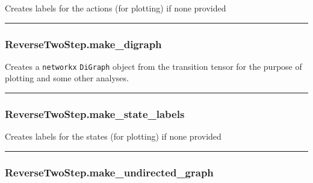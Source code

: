 Creates labels for the actions (for plotting) if none provided

\begin{center}\rule{0.5\linewidth}{\linethickness}\end{center}

\hypertarget{reversetwostep.make_digraph}{%
\subsubsection{ReverseTwoStep.make\_digraph}\label{reversetwostep.make_digraph}}

\begin{Shaded}
\begin{Highlighting}[]
\NormalTok{)}
\end{Highlighting}
\end{Shaded}

Creates a \texttt{networkx} \texttt{DiGraph} object from the transition
tensor for the purpose of plotting and some other analyses.

\begin{center}\rule{0.5\linewidth}{\linethickness}\end{center}

\hypertarget{reversetwostep.make_state_labels}{%
\subsubsection{ReverseTwoStep.make\_state\_labels}\label{reversetwostep.make_state_labels}}

\begin{Shaded}
\begin{Highlighting}[]
\NormalTok{)}
\end{Highlighting}
\end{Shaded}

Creates labels for the states (for plotting) if none provided

\begin{center}\rule{0.5\linewidth}{\linethickness}\end{center}

\hypertarget{reversetwostep.make_undirected_graph}{%
\subsubsection{ReverseTwoStep.make\_undirected\_graph}\label{reversetwostep.make_undirected_graph}}

